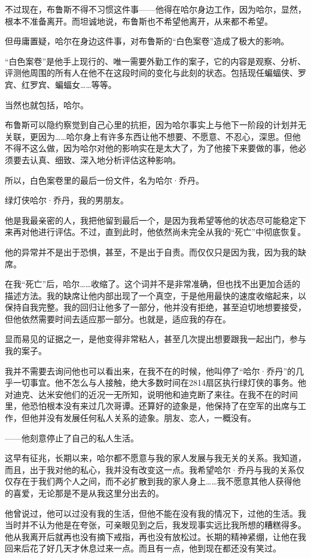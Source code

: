 \documentclass[../main]{subfiles}
\begin{document}
不过现在，布鲁斯不得不习惯这件事——他得在哈尔身边工作，因为哈尔，显然，根本不准备离开。而坦诚地说，布鲁斯也不希望他离开，从来都不希望。

但毋庸置疑，哈尔在身边这件事，对布鲁斯的“白色案卷”造成了极大的影响。

“白色案卷”是他手上现行的、唯一需要外勤工作的案子，它的内容是观察、分析、评测他周围的所有人在他不在这段时间的变化与此刻的状态。包括现任蝙蝠侠、罗宾、红罗宾、蝙蝠女……等等。

当然也就包括，哈尔。

布鲁斯可以隐约察觉到自己心里的抗拒，因为哈尔事实上与他下一阶段的计划并无关联，更因为……哈尔身上有许多东西让他不想要、不愿意、不忍心，深思。但他不得不这么做，因为哈尔对他的影响实在是太大了，为了他接下来要做的事，他必须要去认真、细致、深入地分析评估这种影响。

所以，白色案卷里的最后一份文件，名为哈尔·乔丹。

绿灯侠哈尔·乔丹，我的男朋友。

他是我最亲密的人，我把他留到最后一个，是因为我希望等他的状态尽可能稳定下来再对他进行评估。不过，直到此时，他依然尚未完全从我的“死亡”中彻底恢复。

他的异常并不是出于恐惧，甚至，不是出于自责。而仅仅只是因为我，因为我的缺席。

在我“死亡”后，哈尔……收缩了。这个词并不是非常准确，但也找不出更加合适的描述方法。我的缺席让他内部出现了一个真空，于是他用最快的速度收缩起来，以保持自我完整。我的回归让他多了一部分，他并没有拒绝，甚至迫切地想要接受，但他依然需要时间去适应那一部分。也就是，适应我的存在。

显而易见的证据之一，是他变得非常粘人，甚至几次提出想要跟我一起出门，参与我的案子。

我并不需要去询问他也可以看出来，在我不在的时候，他叫停了“哈尔·乔丹”的几乎一切事宜。他不怎么与人接触，绝大多数时间在2814扇区执行绿灯侠的事务。他对迪克、达米安他们的近况一无所知，说明他和迪克断了来往。在我不在的时间里，他恐怕根本没有来过几次哥谭。还算好的迹象是，他保持了在空军的出席与工作，但他并没有发展任何私人关系的迹象。朋友、恋人，一概没有。

——他刻意停止了自己的私人生活。

这早有征兆，长期以来，哈尔都不愿意与我的家人发展与我无关的关系。我知道，而且，出于我对他的私心，我并没有改变这一点。我希望哈尔·乔丹与我的关系仅仅存在于我们两个人之间，而不必扩散到我的家人身上……我不愿意其他人获得他的喜爱，无论那是不是从我这里分出去的。

他曾说过，他可以过没有我的生活，但他不能在没有我的情况下，过他的生活。我当时并不认为他是在夸张，可亲眼见到之后，我发现事实远比我所想的糟糕得多。他从我离开后就再也没有摘下戒指，再也没有放松过。长期的精神紧绷，让他在我回来后花了好几天才休息过来一点。而且有一点，他到现在都还没有笑过。
\end{document}
